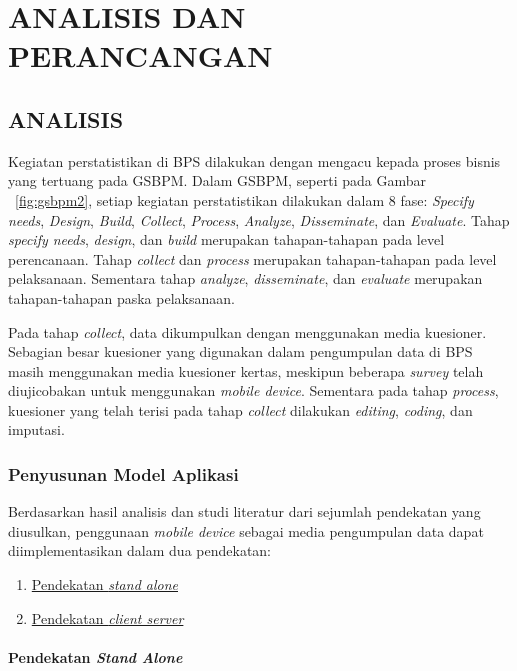 \chapter{ANALISIS DAN PERANCANGAN}


\section{ANALISIS}

Kegiatan perstatistikan di BPS dilakukan dengan mengacu kepada proses bisnis yang tertuang pada GSBPM. Dalam GSBPM, seperti pada Gambar ~\ref{fig:gsbpm2}, setiap kegiatan perstatistikan dilakukan dalam 8 fase: \textit{Specify needs}, \textit{Design}, \textit{Build}, \textit{Collect}, \textit{Process}, \textit{Analyze}, \textit{Disseminate}, dan \textit{Evaluate}. Tahap \textit{specify needs}, \textit{design}, dan \textit{build} merupakan tahapan-tahapan pada level perencanaan. Tahap \textit{collect} dan \textit{process} merupakan tahapan-tahapan pada level pelaksanaan. Sementara tahap \textit{analyze}, \textit{disseminate}, dan \textit{evaluate} merupakan tahapan-tahapan paska pelaksanaan.


Pada tahap \textit{collect}, data dikumpulkan dengan menggunakan media kuesioner. Sebagian besar kuesioner yang digunakan dalam pengumpulan data di BPS masih menggunakan media kuesioner kertas, meskipun beberapa \textit{survey} telah diujicobakan untuk menggunakan \textit{mobile device}. Sementara pada tahap \textit{process}, kuesioner yang telah terisi pada tahap \textit{collect} dilakukan \textit{editing}, \textit{coding}, dan imputasi. 


\subsection{Penyusunan Model Aplikasi} \label{ssec:analysis-application-model}

Berdasarkan hasil analisis dan studi literatur dari sejumlah pendekatan yang diusulkan, penggunaan \textit{mobile device} sebagai media pengumpulan data dapat diimplementasikan dalam dua pendekatan:

\begin{enumerate}
\item \hyperref[sssec:stand-alone]{Pendekatan \textit{stand alone}}
\item \hyperref[sssec:client-server]{Pendekatan \textit{client server}}
\end{enumerate}


\subsubsection{Pendekatan \textit{Stand Alone}} \label{sssec:stand-alone}


